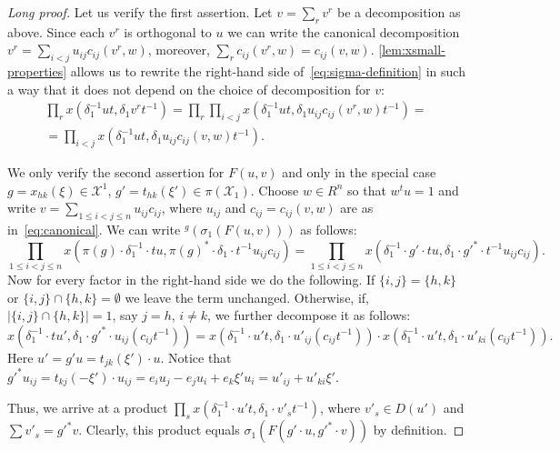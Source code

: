 \documentclass[oneside, 10pt]{amsart}
\numberwithin{equation}{section}
\numberwithin{lemma}{section}
\theoremstyle{definition}
\theoremstyle{remark}
\begin{document}
\begin{proof}[Long proof]
 Let us verify the first assertion. Let $v = \sum_r v^r$ be a decomposition as above. 
 Since each $v^r$ is orthogonal to $u$ we can write the canonical decomposition  
 $v^r = \sum_{i<j} u_{ij} c_{ij}(v^r, w)$, moreover, $\sum_{r} c_{ij}(v^r, w) = c_{ij}(v, w)$.
 \cref{lem:xsmall-properties} allows us to rewrite the right-hand side of~\ref{eq:sigma-definition} in such a way that 
  it does not depend on the choice of decomposition for $v$:
 \begin{multline}
  \prod\limits_r x(\delta_1^{-1} ut, \delta_1 v^rt^{-1}) = \prod\limits_{r}\prod\limits_{i<j} x(\delta_1^{-1} ut, \delta_1 u_{ij}c_{ij}(v^r, w)t^{-1}) = \\ 
   = \prod\limits_{i<j} x(\delta_1^{-1} ut, \delta_1 u_{ij}c_{ij}(v, w)t^{-1}). 
 \end{multline}

 We only verify the second assertion for $F(u, v)$  and only in the special case $g = x_{hk}(\xi) \in \mathcal{X}^1$, $g' = t_{hk}(\xi') \in \pi(\mathcal{X}_1)$.
 Choose $w\in R^n$ so that $w^t u = 1$ and write $v = \sum_{1\leq i<j\leq n} u_{ij} c_{ij}$, where $u_{ij}$ and $c_{ij} = c_{ij}(v, w)$ are as in~\eqref{eq:canonical}. 
 We can write ${}^g\left(\sigma_1\left(F(u, v)\right)\right)$ as follows:
 \begin{equation} \nonumber
   \prod\limits_{1\leq i<j\leq n} x(\pi(g) \cdot \delta_1^{-1} \cdot t u, \pi(g)^* \cdot \delta_1 \cdot t^{-1} u_{ij}c_{ij})
                                   = \prod\limits_{1\leq i<j\leq n} x(\delta_1^{-1} \cdot g'\cdot t u, \delta_1 \cdot {g'}^* \cdot t^{-1} u_{ij}c_{ij}).
 \end{equation} 
 Now for every factor in the right-hand side we do the following.
 If $\{i, j\} = \{h, k\}$ or $\{i, j\} \cap \{h, k\} = \emptyset$ we leave the term unchanged.
 Otherwise, if, $|\{i, j\} \cap \{h, k\}| = 1$,  say $j = h$, $i\neq k$, we further decompose it as follows:
  \begin{equation} \nonumber
    x(\delta_1^{-1} \cdot t u', \delta_1 \cdot {g'}^* \cdot u_{ij} (c_{ij} t^{-1})) = 
     x(\delta_1^{-1} \cdot u' t, \delta_1 \cdot u'_{ij} (c_{ij} t^{-1})) \cdot 
     x(\delta_1^{-1} \cdot u' t, \delta_1 \cdot u'_{ki} (c_{ij} t^{-1})).
  \end{equation}
  Here $u' = g'  u = t_{jk}(\xi') \cdot u$.
  Notice that ${g'}^*u_{ij} = t_{kj}(-\xi') \cdot u_{ij} = e_iu_j - e_ju_i + e_k\xi'u_i =u'_{ij}+u'_{ki}\xi'$. 
  
  Thus, we arrive at a product $\prod_{s} x(\delta_1^{-1} \cdot u't, \delta_1 \cdot v'_s t^{-1}) $, where $v'_s \in D(u')$ and
   $\sum v'_s = {g'}^*v$. Clearly, this product equals $\sigma_1\left(F(g' \cdot u, {g'}^{*} \cdot v)\right)$ by definition.
\end{proof}
\end{document}
